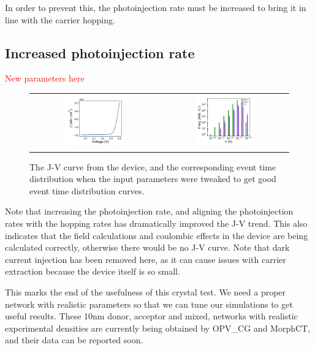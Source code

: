 \documentclass[12pt]{article}
\begin{document}
In order to prevent this, the photoinjection rate must be increased to bring it in line with the carrier hopping.


\subsection{Increased photoinjection rate}


\textcolor{red}{New parameters here}

\begin{figure}[h!]\centering
	\begin{tabular}{cc}
		\includegraphics[width=0.5\textwidth]{Figures/secondJV.pdf}&
		\includegraphics[width=0.5\textwidth]{Figures/secondEventTime.pdf}\\
	\end{tabular}
    \caption{The J-V curve from the device, and the corresponding event time distribution when the input parameters were tweaked to get good event time distribution curves.}
	\label{fig:device2}
\end{figure}


Note that increasing the photoinjection rate, and aligning the photoinjection rates with the hopping rates has dramatically improved the J-V trend.
This also indicates that the field calculations and coulombic effects in the device are being calculated correctly, otherwise there would be no J-V curve.
Note that dark current injection has been removed here, as it can cause issues with carrier extraction because the device itself is so small.


This marks the end of the usefulness of this crystal test.
We need a proper network with realistic parameters so that we can tune our simulations to get useful results.
These 10nm donor, acceptor and mixed, networks with realistic experimental densities are currently being obtained by OPV\_CG and MorphCT, and their data can be reported soon.



\end{document}
